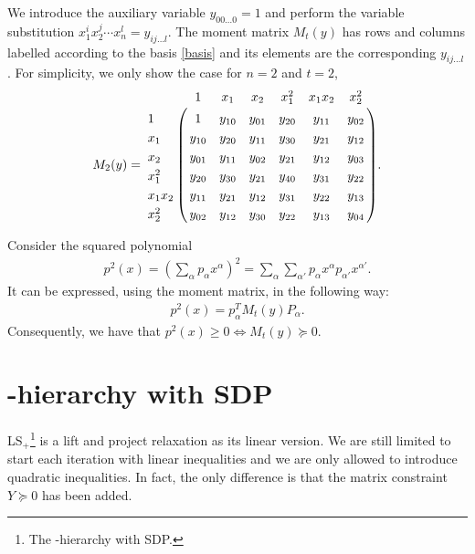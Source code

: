 \documentclass[a4paper,twoside,justified]{tufte-handout}
\begin{document}
We introduce the auxiliary variable $y_{00\ldots 0}=1$ and perform the variable substitution $x_1^ix_2^j\cdots x_n^l=y_{ij\ldots l}$. The moment matrix $M_t(y)$ has rows and columns labelled according to the basis \eqref{basis} and its elements are the corresponding $y_{ij\ldots l}$. For simplicity, we only show the case for $n=2$ and $t=2$, 
\begin{eqnarray*}
M_2(y)=
\bordermatrix{~ & 1            & x_1     &x_2      &x_1^2 &x_1x_2&x_2^2 \cr
                         1 & 1           & y_{10} & y_{01}&y_{20}&y_{11}&y_{02} \cr
                     x_1 & y_{10}  & y_{20} & y_{11}&y_{30}&y_{21}&y_{12} \cr
                     x_2 & y_{01}  & y_{11} & y_{02}&y_{21}&y_{12}&y_{03} \cr
                x_1^2 & y_{20}  & y_{30} & y_{21}&y_{40}&y_{31}&y_{22} \cr
             x_1x_2  & y_{11}  & y_{21} & y_{12}&y_{31}&y_{22}&y_{13} \cr
            x_2^2     & y_{02}  & y_{12} & y_{30}&y_{22}&y_{13}&y_{04} \cr}.
\end{eqnarray*}

Consider the squared polynomial
\begin{eqnarray*}
p^2(x)=(\sum_{\alpha}p_{\alpha}x^{\alpha})^2=\sum_{\alpha}\sum_{\alpha'}p_{\alpha}x^{\alpha}p_{\alpha'}x^{\alpha'}.
\end{eqnarray*}
It can be expressed, using the moment matrix, in the following way:
\begin{eqnarray*}
p^2(x)=p_{\alpha}^TM_t(y)P_{\alpha}.
\end{eqnarray*}
Consequently, we have that $p^2(x)\geq0\Leftrightarrow M_t(y)\succeq0$.

\section{\Lovasz-\Schrijver hierarchy with SDP}
 LS$_+$\footnote{The \Lovasz-\Schrijver hierarchy with SDP.} is a lift and project relaxation as its linear version. We are still limited to start each iteration with linear inequalities and we are only allowed to introduce quadratic inequalities. In fact, the only difference is that the matrix constraint $Y\succeq0$ has been added.
\end{document}
